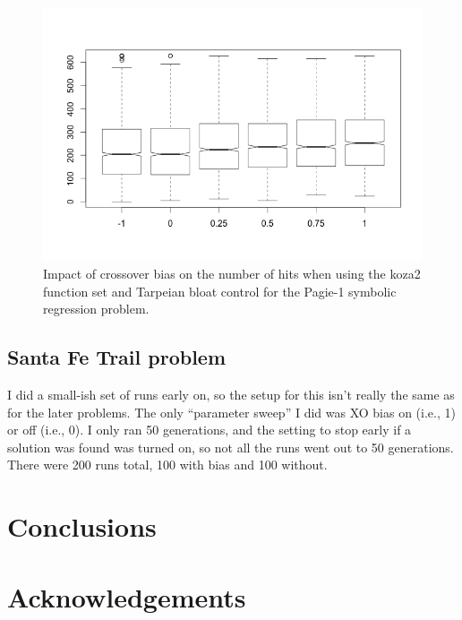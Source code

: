 \documentclass{sig-alternate}
\begin{document}
\begin{figure}
\centering
\includegraphics[width=0.45 \textwidth]{Plots/Pagie-1-tarp.png}
\caption{Impact of crossover bias on the number of hits when using the koza2 function set and Tarpeian bloat 
control for the Pagie-1 symbolic regression problem.}
\label{fig:Pagie1Koza2Tarpeian}
\end{figure}

\subsection{Santa Fe Trail problem}

I did a small-ish set of runs early on, so the setup for this isn't really the same as for the later problems. The 
only ``parameter sweep'' I did was XO bias on (i.e., 1) or off (i.e., 0). I only ran 50 generations, and the setting 
to stop early if a solution was found was turned on, so not all the runs went out to 50 generations. There were 
200 runs total, 100 with bias and 100 without.

\section{Conclusions} \label{Conclusions}

\section*{Acknowledgements}

\pagebreak



\end{document}
